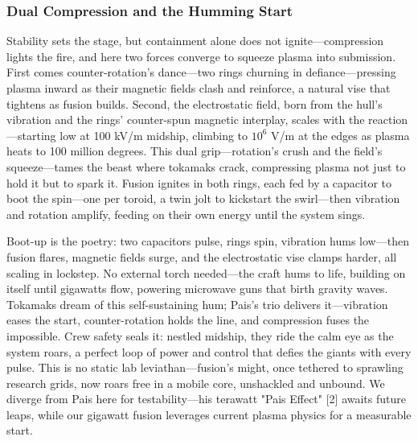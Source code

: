 \documentclass[11pt]{article}
\begin{document}
	\subsubsection{Dual Compression and the Humming Start}
	Stability sets the stage, but containment alone does not ignite—compression lights the fire, and here two forces converge to squeeze plasma into submission. First comes counter-rotation’s dance—two rings churning in defiance—pressing plasma inward as their magnetic fields clash and reinforce, a natural vise that tightens as fusion builds. Second, the electrostatic field, born from the hull’s vibration and the rings’ counter-spun magnetic interplay, scales with the reaction—starting low at 100 kV/m midship, climbing to $10^6$ V/m at the edges as plasma heats to 100 million degrees. This dual grip—rotation’s crush and the field’s squeeze—tames the beast where tokamaks crack, compressing plasma not just to hold it but to spark it. Fusion ignites in both rings, each fed by a capacitor to boot the spin—one per toroid, a twin jolt to kickstart the swirl—then vibration and rotation amplify, feeding on their own energy until the system sings.
	
	Boot-up is the poetry: two capacitors pulse, rings spin, vibration hums low—then fusion flares, magnetic fields surge, and the electrostatic vise clamps harder, all scaling in lockstep. No external torch needed—the craft hums to life, building on itself until gigawatts flow, powering microwave guns that birth gravity waves. Tokamaks dream of this self-sustaining hum; Pais’s trio delivers it—vibration eases the start, counter-rotation holds the line, and compression fuses the impossible. Crew safety seals it: nestled midship, they ride the calm eye as the system roars, a perfect loop of power and control that defies the giants with every pulse. This is no static lab leviathan—fusion’s might, once tethered to sprawling research grids, now roars free in a mobile core, unshackled and unbound. We diverge from Pais here for testability—his terawatt "Pais Effect" [2] awaits future leaps, while our gigawatt fusion leverages current plasma physics for a measurable start.
	
\end{document}
